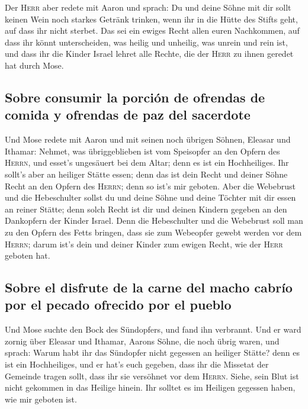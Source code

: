  Der \textsc{Herr} aber redete mit Aaron und sprach:
 Du und deine Söhne mit dir sollt keinen Wein noch starkes
Getränk trinken, wenn ihr in die Hütte des Stifts geht, auf dass ihr
nicht sterbet. Das sei ein ewiges Recht allen euren Nachkommen,
 auf dass ihr könnt unterscheiden, was heilig und
unheilig, was unrein und rein ist,  und dass ihr die
Kinder Israel lehret alle Rechte, die der \textsc{Herr} zu ihnen geredet
hat durch Mose.

\hypertarget{sobre-consumir-la-porciuxf3n-de-ofrendas-de-comida-y-ofrendas-de-paz-del-sacerdote}{%
\subsection{Sobre consumir la porción de ofrendas de comida y ofrendas
de paz del
sacerdote}\label{sobre-consumir-la-porciuxf3n-de-ofrendas-de-comida-y-ofrendas-de-paz-del-sacerdote}}

 Und Mose redete mit Aaron und mit seinen noch übrigen
Söhnen, Eleasar und Ithamar: Nehmet, was übriggeblieben ist vom
Speisopfer an den Opfern des \textsc{Herrn}, und esset's ungesäuert bei
dem Altar; denn es ist ein Hochheiliges.  Ihr sollt's
aber an heiliger Stätte essen; denn das ist dein Recht und deiner Söhne
Recht an den Opfern des \textsc{Herrn}; denn so ist's mir geboten.
 Aber die Webebrust und die Hebeschulter sollst du und
deine Söhne und deine Töchter mit dir essen an reiner Stätte; denn solch
Recht ist dir und deinen Kindern gegeben an den Dankopfern der Kinder
Israel.  Denn die Hebeschulter und die Webebrust soll man
zu den Opfern des Fetts bringen, dass sie zum Webeopfer gewebt werden
vor dem \textsc{Herrn}; darum ist's dein und deiner Kinder zum ewigen
Recht, wie der \textsc{Herr} geboten hat.

\hypertarget{sobre-el-disfrute-de-la-carne-del-macho-cabruxedo-por-el-pecado-ofrecido-por-el-pueblo}{%
\subsection{Sobre el disfrute de la carne del macho cabrío por el pecado
ofrecido por el
pueblo}\label{sobre-el-disfrute-de-la-carne-del-macho-cabruxedo-por-el-pecado-ofrecido-por-el-pueblo}}

 Und Mose suchte den Bock des Sündopfers, und fand ihn
verbrannt. Und er ward zornig über Eleasar und Ithamar, Aarons Söhne,
die noch übrig waren, und sprach:  Warum habt ihr das
Sündopfer nicht gegessen an heiliger Stätte? denn es ist ein
Hochheiliges, und er hat's euch gegeben, dass ihr die Missetat der
Gemeinde tragen sollt, dass ihr sie versöhnet vor dem \textsc{Herrn}.
 Siehe, sein Blut ist nicht gekommen in das Heilige
hinein. Ihr solltet es im Heiligen gegessen haben, wie mir geboten ist.


